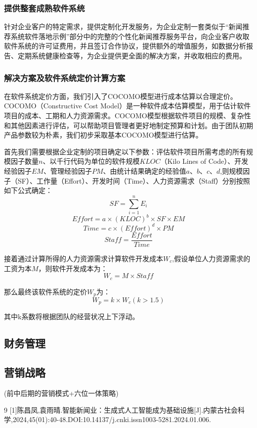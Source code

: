 \documentclass[withoutpreface,bwprint]{cumcmthesis} %
\begin{document}
	\subsubsection{ 提供整套成熟软件系统}
	针对企业客户的特定需求，提供定制化开发服务，为企业定制一套类似于“新闻推荐系统软件落地示例”部分中的完整的个性化新闻推荐服务平台，向企业客户收取软件系统的许可证费用，并且签订合作协议，提供额外的增值服务，如数据分析报告、定期系统健康检查等，为企业提供更全面的解决方案，并收取相应的费用。
	\subsubsection{ 解决方案及软件系统定价计算方案}
	在软件系统定价方面，我们引入了COCOMO模型进行成本估算以合理定价。COCOMO（Constructive Cost Model）是一种软件成本估算模型，用于估计软件项目的成本、工期和人力资源需求。COCOMO模型根据软件项目的规模、复杂性和其他因素进行评估，可以帮助项目管理者更好地制定预算和计划。由于团队初期产品参数较为朴素，我们初步采取基本COCOMO模型进行估算。\par
	首先我们需要根据企业定制的项目确定以下参数：评估软件项目所需考虑的所有规模因子数量$n$、以千行代码为单位的软件规模$KLOC$（Kilo Lines of Code）、开发经验因子$EM$、管理经验因子$PM$、由统计结果确定的经验值$a$、$b$、$c$、$d$,则规模因子（SF）、工作量（Effort）、开发时间（Time）、人力资源需求（Staff）分别按照如下公式确定：
	\begin{equation}
		SF = \sum_{i=1}^{n} E_i
	\end{equation}
	\begin{equation}
		Effort = a \times (KLOC)^b \times SF \times EM
	\end{equation}
	\begin{equation}
		Time = c \times (Effort)^d \times PM
	\end{equation}
	\begin{equation}
		Staff = \frac{Effort}{Time}
	\end{equation}
	\par
	接着通过计算所得的人力资源需求计算软件开发成本$W_c$,假设单位人力资源需求的工资为本$M$，则软件开发成本为：
	\begin{equation}
		W_c = M \times Staff
	\end{equation}\par
	那么最终该软件系统的定价$W_p$为：
	\begin{equation}
	W_p = k \times W_c (k>1.5)
	\end{equation}\par
	其中k系数将根据团队的经营状况上下浮动。
	\subsection{财务管理}
	\subsection{营销战略}(前中后期的营销模式+六位一体策略)
	\newpage
	\begin{thebibliography}{9}%
		[1]陈昌凤,袁雨晴.智能新闻业：生成式人工智能成为基础设施[J].内蒙古社会科学,2024,45(01):40-48.DOI:10.14137/j.cnki.issn1003-5281.2024.01.006.
	\end{thebibliography}
\end{document}
